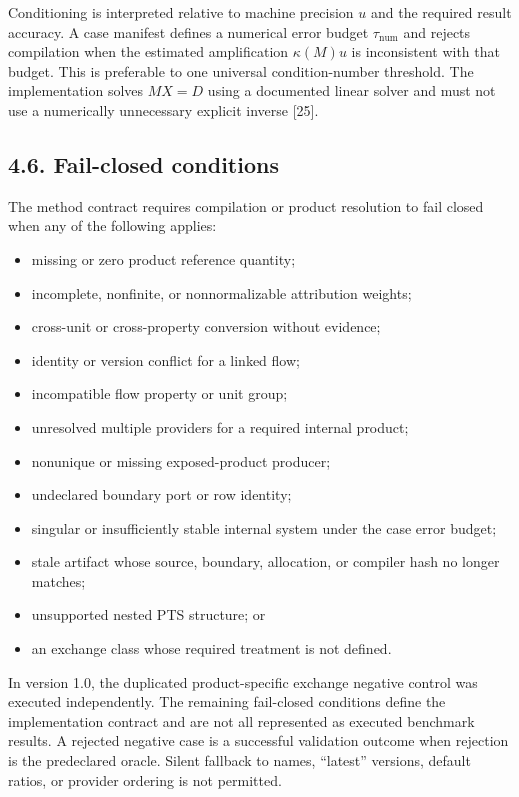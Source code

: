 \documentclass[
  10pt,
  a4paper,
  DIV=11,
  numbers=noendperiod]{scrartcl}
\providecommand{\tightlist}{%
  \setlength{\itemsep}{0pt}\setlength{\parskip}{0pt}}
\begin{document}
Conditioning is interpreted relative to machine precision \(u\) and the
required result accuracy. A case manifest defines a numerical error
budget \(\tau_{\mathrm{num}}\) and rejects compilation when the
estimated amplification \(\kappa(M)u\) is inconsistent with that budget.
This is preferable to one universal condition-number threshold. The
implementation solves \(MX=D\) using a documented linear solver and must
not use a numerically unnecessary explicit inverse {[}25{]}.

\subsection{4.6. Fail-closed conditions}\label{fail-closed-conditions}

The method contract requires compilation or product resolution to fail
closed when any of the following applies:

\begin{itemize}
\tightlist
\item
  missing or zero product reference quantity;
\item
  incomplete, nonfinite, or nonnormalizable attribution weights;
\item
  cross-unit or cross-property conversion without evidence;
\item
  identity or version conflict for a linked flow;
\item
  incompatible flow property or unit group;
\item
  unresolved multiple providers for a required internal product;
\item
  nonunique or missing exposed-product producer;
\item
  undeclared boundary port or row identity;
\item
  singular or insufficiently stable internal system under the case error
  budget;
\item
  stale artifact whose source, boundary, allocation, or compiler hash no
  longer matches;
\item
  unsupported nested PTS structure; or
\item
  an exchange class whose required treatment is not defined.
\end{itemize}

In version 1.0, the duplicated product-specific exchange negative
control was executed independently. The remaining fail-closed conditions
define the implementation contract and are not all represented as
executed benchmark results. A rejected negative case is a successful
validation outcome when rejection is the predeclared oracle. Silent
fallback to names, ``latest'' versions, default ratios, or provider
ordering is not permitted.
\end{document}
